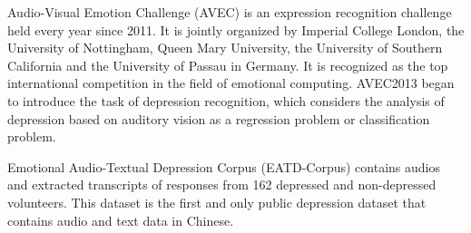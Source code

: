 Audio-Visual Emotion Challenge (AVEC) is an expression recognition challenge held every year since 2011. It is jointly organized by Imperial College London, the University of Nottingham, Queen Mary University, the University of Southern California and the University of Passau in Germany. It is recognized as the top international competition in the field of emotional computing. AVEC2013 began to introduce the task of depression recognition, which considers the analysis of depression based on auditory vision as a regression problem or classification problem.


Emotional Audio-Textual Depression Corpus (EATD-Corpus) contains audios and extracted transcripts of responses from 162 depressed and non-depressed volunteers. This dataset is the first and only public depression dataset that contains audio and text data in Chinese.

%
%


